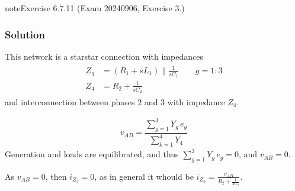 \documentclass[letterpaper,10pt,english]{jupyterBook}
\begin{document}
\begin{sphinxadmonition}{note}{Exercise 6.7.11 (Exam 2024\sphinxhyphen{}09\sphinxhyphen{}06, Exercise 3.)}



\begin{figure}[htbp]
\centering

\noindent{}
\end{figure}
\subsubsection*{Solution}

\sphinxAtStartPar
This network is a star\sphinxhyphen{}star connection with impedances
\begin{equation*}
\begin{split}\begin{aligned}
  Z_g & = ( R_1 + s L_1 ) \parallel \frac{1}{s C_1} \qquad g = 1:3 \\
  Z_4 & = R_2 + \frac{1}{s C_2}
\end{aligned}\end{split}
\end{equation*}
\sphinxAtStartPar
and inter\sphinxhyphen{}connection between phases \(2\) and \(3\) with impedance \(Z_4\).



\sphinxAtStartPar
{}
\begin{equation*}
\begin{split}v_{AB} = \dfrac{ \sum_{g=1}^{3} Y_g \, e_g }{\sum_{k=1}^{4} Y_4}\end{split}
\end{equation*}
\sphinxAtStartPar
Generation and loads are equilibrated, and thus \(\sum_{g=1}^{3} Y_g \, e_g = 0\), and \(v_{AB} = 0\).

\sphinxAtStartPar
{} As \(v_{AB}=0\), then \(i_{Z_2} = 0\), as in general it whould be \(i_{Z_2} = \frac{v_{AB}}{R_2 + \frac{1}{sC_2}}\).


\end{sphinxadmonition}
\end{document}
